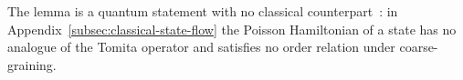 \documentclass[a4paper,11pt]{article}
\theoremstyle{definition}
\newcommand{\mN}{\mathcal{N}}
\newcommand{\mH}{\mathcal{H}}
\newcommand{\mM}{\mathcal{M}}
\begin{document}
The lemma is a quantum statement with no classical counterpart~\cite{Lashkari2019Constraining,FuruyaLashkariOuseph2023}: in Appendix~\ref{subsec:classical-state-flow} the Poisson Hamiltonian of a state has no analogue of the Tomita operator and satisfies no order relation under coarse-graining.
\end{document}
